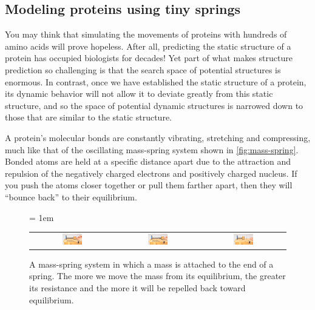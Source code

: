 \subsection{Modeling proteins using tiny springs}

You may think that simulating the movements of proteins with hundreds of amino acids will prove hopeless. After all, predicting the static structure of a protein has occupied biologists for decades! Yet part of what makes structure prediction so challenging is that the search space of potential structures is enormous. In contrast, once we have established the static structure of a protein, its dynamic behavior will not allow it to deviate greatly from this static structure, and so the space of potential dynamic structures is narrowed down to those that are similar to the static structure.

A protein's molecular bonds are constantly vibrating, stretching and compressing, much like that of the oscillating mass-spring system shown in \autoref{fig:mass-spring}. Bonded atoms are held at a specific distance apart due to the attraction and repulsion of the negatively charged electrons and positively charged nucleus. If you push the atoms closer together or pull them farther apart, then they will ``bounce back'' to their equilibrium.\\

\begin{figure}[h]
	\centering
	\tabcolsep = 1em
	\mySfFamily
	\begin{tabular}{c c c}
		\includegraphics[width = 0.25\textwidth]{../images/mass_spring1.png} & \includegraphics[width = 0.25\textwidth]{../images/mass_spring2.png} & \includegraphics[width = 0.25\textwidth]{../images/mass_spring3.png}
	\end{tabular}
	\caption{A mass-spring system in which a mass is attached to the end of a spring. The more we move the mass from its equilibrium, the greater its resistance and the more it will be repelled back toward equilibrium.}
	\label{fig:mass-spring}
\end{figure}


